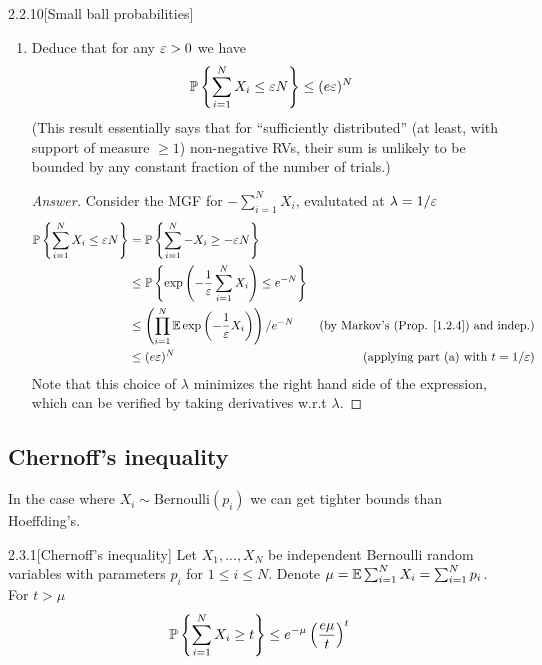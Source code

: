 {\begin{ex}{2.2.10}[Small ball probabilities]
\begin{enumerate}[label=(\alph*)]
\item Deduce that for any $\varepsilon > 0$ we have
\begin{align*}
    \mathbb{P} \left\{\sum_{i=1}^N X_i \leq \varepsilon N\right\} \leq (e\varepsilon)^N
\end{align*}
(This result essentially says that for ``sufficiently distributed'' (at least, with support of measure $\geq 1$) non-negative RVs, their sum is unlikely to be bounded by any constant fraction of the number of trials.)
\begin{proof}[Answer]
Consider the MGF for $-\sum_{i=1}^N X_i$, evalutated at $\lambda = 1/\varepsilon$
\begin{align*}
    \mathbb{P} \left\{\sum_{i=1}^N X_i \leq \varepsilon N\right\} &= \mathbb{P} \left\{\sum_{i=1}^N -X_i \geq -\varepsilon N\right\} \\
    &\leq \mathbb{P} \left\{\exp\left(-\frac 1 {\varepsilon}\sum_{i=1}^N X_i\right) \leq e^ {- N }\right\} \\
    &\leq\left(\prod_{i=1}^N \mathbb{E} \exp\left(-\frac1{\varepsilon} X_i\right)\right) /e^{-N} &\text{(by Markov's (Prop. \ref{1.2.4}) and indep.)} \\
    &\leq (e\varepsilon)^N &\text{(applying part (a) with $t=1/\varepsilon$)}
\end{align*}
Note that this choice of $\lambda$ minimizes the right hand side of the expression, which can be verified by taking derivatives w.r.t $\lambda$.
\end{proof}
\end{enumerate}
\end{ex}


\subsection{Chernoff's inequality}

In the case where $X_i \sim \text{Bernoulli}(p_i)$ we can get tighter bounds than Hoeffding's.

\begin{thm}{2.3.1}[Chernoff's inequality]\label{2.3.1}
Let $X_1,...,X_N$ be independent Bernoulli random variables with parameters $p_i$ for $1 \leq i \leq N$. Denote $\mu = \mathbb{E}\sum_{i=1}^N X_i = \sum_{i=1}^N p_i$. For $t>\mu$
\begin{align*}
    \mathbb{P} \left\{\sum_{i=1}^N X_i \geq t \right\} \leq e^{-\mu}\left(\frac {e \mu} {t}\right)^t
\end{align*}
\end{thm}

}
